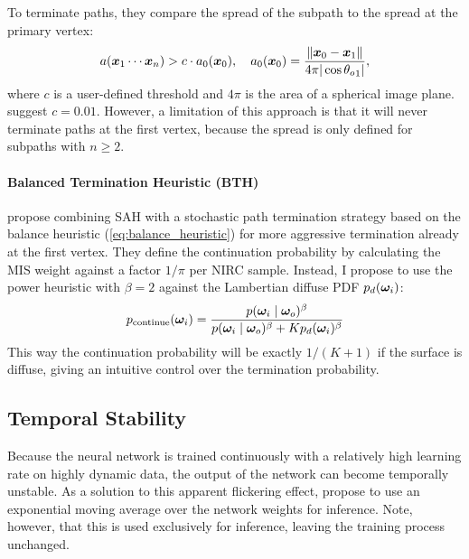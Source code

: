 To terminate paths, they compare the spread of the subpath to the spread at the primary vertex:
\begin{equation}
    a(\bm{x}_1 \cdots \bm{x}_n) > c \cdot a_0(\bm{x}_0), \quad a_0(\bm{x}_0) = \frac{\|\bm{x}_0 - \bm{x}_1\|}{4 \pi |\cos {\theta_o}_1|},
\end{equation}
where $c$ is a user-defined threshold and $4\pi$ is the area of a spherical image plane.
\textcite{muller2021} suggest $c=0.01$.
However, a limitation of this approach is that it will never terminate paths at the first vertex, because the spread is only defined for subpaths with $n \geq 2$.

\paragraph{Balanced Termination Heuristic (BTH)}
\label{par:pt_bth}
\textcite{dereviannykh2024} propose combining SAH with a stochastic path termination strategy based on the balance heuristic (\cref{eq:balance_heuristic}) for more aggressive termination already at the first vertex.
They define the continuation probability by calculating the MIS weight against a factor $1/\pi$ per NIRC sample.
Instead, I propose to use the power heuristic with $\beta=2$ against the Lambertian diffuse PDF $p_d({\bm{\omega}_i})$:
\begin{equation}
    p_{\text{continue}}({\bm{\omega}_i}) = \frac{p({\bm{\omega}_i} \mid {\bm{\omega}_o})^\beta}{p({\bm{\omega}_i} \mid {\bm{\omega}_o})^\beta + K p_d({\bm{\omega}_i})^\beta}
\end{equation}
This way the continuation probability will be exactly $1/(K+1)$ if the surface is diffuse, giving an intuitive control over the termination probability.

\subsection{Temporal Stability}
Because the neural network is trained continuously with a relatively high learning rate on highly dynamic data, the output of the network can become temporally unstable.
As a solution to this apparent flickering effect, \textcite{muller2021} propose to use an exponential moving average over the network weights for inference.
Note, however, that this is used exclusively for inference, leaving the training process unchanged.